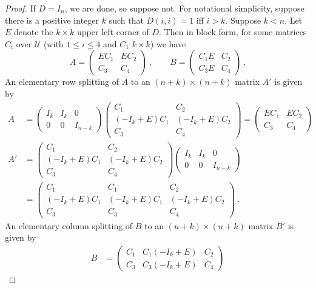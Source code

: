 \documentclass{amsart}
\theoremstyle{definition}
\theoremstyle{remark}
\numberwithin{equation}{section}
\begin{document}
{\begin{proof} 
If $D=I_n$, we are done, so suppose not. For notational simplicity, suppose there is 
a positive integer $k$ such that $D(i,i) =1$ iff $i>k$. Suppose 
$k<n$.  Let $E$ denote the 
$k\times k$ upper left corner of $D$. Then in block form, for 
some matrices $C_i$ over $\mathcal U$ (with $1\leq i\leq 4$ and $C_1$ $k\times k$) 
we have 
\[
A = \begin{pmatrix} EC_1 & EC_2\\C_3&C_4 \end{pmatrix} \ , \qquad 
B = \begin{pmatrix} C_1E & C_2\\C_3E&C_4 \end{pmatrix} \ . 
\] 
An elementary row splitting of $A$ to an $(n+k)\times (n+k)$ matrix $A'$ 
is given by 
\begin{align*}
A & 
 = \begin{pmatrix} I_k & I_k& 0 \\0 & 0 & I_{n-k} \end{pmatrix} 
 \begin{pmatrix} C_1 & C_2\\(-I_k+E)C_1&(-I_k+E)C_2\\C_3 & C_4 \end{pmatrix}
=\begin{pmatrix} EC_1 & EC_2\\C_3&C_4 \end{pmatrix}  \\ 
A'
&= \begin{pmatrix} C_1 & C_2\\(-I_k+E)C_1&(-I_k+E)C_2\\C_3 & C_4 \end{pmatrix}
 \begin{pmatrix} I_k & I_k& 0 \\0 & 0 & I_{n-k} \end{pmatrix}  \\ 
&=\begin{pmatrix} C_1 & C_1 & 
C_2\\(-I_k+E)C_1&(-I_k+E)C_1&(-I_k+E)C_2\\C_3 &C_3 & C_4 \end{pmatrix} \ .
\end{align*} 
An elementary column splitting of $B$ to an $(n+k)\times (n+k)$ matrix $B'$ 
is given by 
\begin{align*}
B & = 
 \begin{pmatrix} C_1 & C_1(-I_k+E)& C_2\\ C_3 & C_3(-I_k+E) &C_4 \end{pmatrix} 

\end{align*}
\end{proof}}
\end{document}
